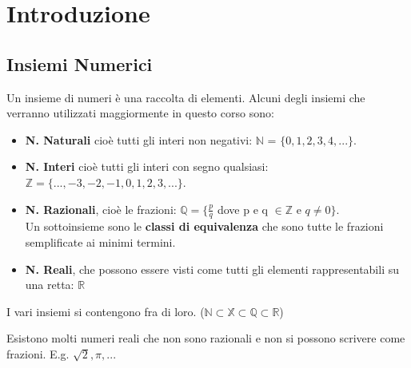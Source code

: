 \section{Introduzione}

\subsection{Insiemi Numerici}
Un insieme di numeri è una raccolta di elementi. Alcuni degli insiemi che verranno utilizzati maggiormente in questo corso sono:
\begin{itemize}
    \item \textbf{N. Naturali} cioè tutti gli interi non negativi: $\mathbb{N}$ = $\{0, 1, 2, 3, 4, ...\}$.
    \item \textbf{N. Interi} cioè tutti gli interi con segno qualsiasi: $\mathbb{Z} = \{..., -3, -2, -1, 0, 1, 2, 3, ...\}$.
    \item \textbf{N. Razionali}, cioè le frazioni: $\mathbb{Q} = \{\frac{p}{q}$ dove p e q $\in \mathbb{Z}$ e $q \neq 0\}$. \\
    Un sottoinsieme sono le \textbf{classi di equivalenza} che sono tutte le frazioni semplificate ai minimi termini. 
    \item \textbf{N. Reali}, che possono essere visti come tutti gli elementi rappresentabili su una retta: $\mathbb{R}$ 
\end{itemize}
\begin{note}
I vari insiemi si contengono fra di loro. ($\mathbb{N} \subset \mathbb{X} \subset \mathbb{Q} \subset \mathbb{R}$) 
\end{note}
\begin{note}
Esistono molti numeri reali che non sono razionali e non si possono scrivere come frazioni. E.g. $\sqrt{2}, \pi, ...$
\end{note}

